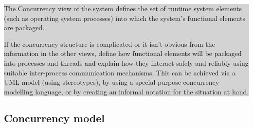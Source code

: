 \documentclass[a4paper,11pt]{report}
\newcommand{\instructions}[1]{
  \noindent\colorbox{lightgray}{%
    \parbox{\linewidth}{%
      #1
    }%
  }%
 \vspace{0.1cm}
}
\begin{document}
\instructions{
The Concurrency view of the system defines the set of runtime system
elements (such as operating system processes) into which the system’s
functional elements are packaged.

If the concurrency structure is complicated or it isn’t obvious from
the information in the other views, define how functional elements
will be packaged into processes and threads and explain how they
interact safely and reliably using suitable inter-process
communication mechanisms. This can be achieved via a UML model (using
stereotypes), by using a special purpose concurrency modelling
language, or by creating an informal notation for the situation at
hand.
}

\subsection{Concurrency model}
\label{sec:concurrency-model}
\end{document}
